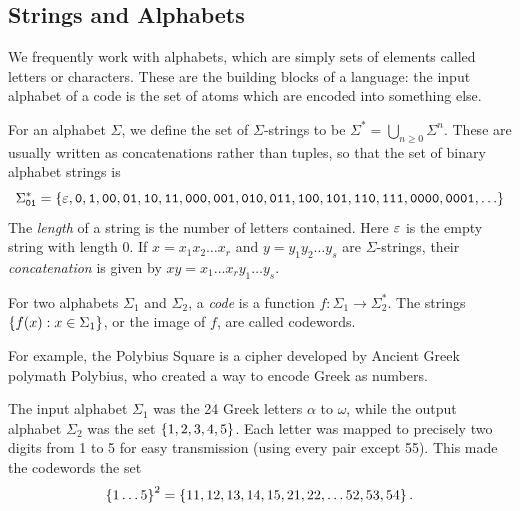 \documentclass{article}
\begin{document}

\subsection{Strings and Alphabets}
\label{section-noiseless-strings-and-alphabets}

We frequently work with alphabets,
which are simply sets of elements called letters or characters.
These are the building blocks of a language:
the input alphabet of a code is the set of atoms
which are encoded into something else.

\begin{definition}
	\label{string-concatenation-length}
	For an alphabet $\Sigma$,
	we define the set of $\Sigma$-strings to be
	$\Sigma^* = \bigcup_{n \geq 0} \Sigma^n$.
	These are usually written as concatenations rather than tuples,
	so that the set of binary alphabet strings is
	\[
	\Sigma_\texttt{01}^* = \set{
	\eps, \texttt{0}, \texttt{1},
	\texttt{00}, \texttt{01}, \texttt{10}, \texttt{11},
	\texttt{000}, \texttt{001}, \texttt{010}, \texttt{011},
	\texttt{100}, \texttt{101}, \texttt{110}, \texttt{111},
	\texttt{0000}, \texttt{0001}, \dots }
	\]
	The \textit{length} of a string
	is the number of letters contained.
	Here $\varepsilon$ is the empty string with length 0.
	If $x = x_1x_2\dots x_r$ and $y = y_1 y_2\dots y_s$ are $\Sigma$-strings,
	their \textit{concatenation} is given by $xy=x_1 \dots x_r y_1 \dots y_s$.
\end{definition}

For two alphabets $\Sigma_1$ and $\Sigma_2$, a \textit{code} is a function $f: \Sigma_1 \to \Sigma_2^*$. The strings $\left\lbrace f(x): x \in \Sigma_1 \right\rbrace$, or the image of $f$, are called codewords.

\begin{example}
	\label{polybius-square-example}
    For example, the Polybius Square
    is a cipher developed by Ancient Greek polymath Polybius,
    who created a way to encode Greek as numbers.
    
    The input alphabet $\Sigma_1$
    was the 24 Greek letters $\alpha$ to $\omega$,
    while the output alphabet $\Sigma_2$
    was the set $\left\lbrace 1, 2, 3, 4, 5 \right\rbrace$.
    Each letter was mapped to precisely two digits from 1 to 5
    for easy transmission (using every pair except 55).
    This made the codewords the set
    \[
	\left\lbrace 1 \dots 5 \right\rbrace^2 =
	\left\lbrace 11, 12, 13, 14, 15, 21, 22, \dots 52, 53, 54 \right\rbrace.
	\]
\end{example}
\end{document}
